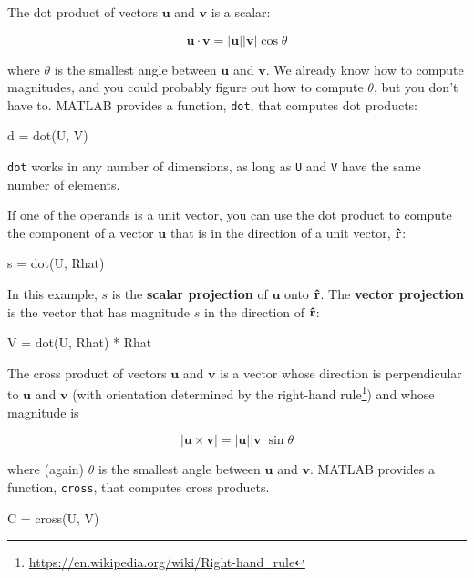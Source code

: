 \documentclass[
]{book}
\numberwithin{Answer}{chapter}
\numberwithin{Exercise}{chapter}
\renewcommand{\vec}[1]{\bm{\mathbf{#1}}}
\newcommand{\uveci}{{\bm{\hat{\textnormal{\bfseries\i}}}}}
\newcommand{\uvecj}{{\bm{\hat{\textnormal{\bfseries\j}}}}}
\newcommand{\uvec}[1]{%
    \ifthenelse{\equal{#1}{i}}%
        {\uveci}{%
    \ifthenelse{\equal{#1}{j}}%
        {\uvecj}{%
    {\bm{\hat{\mathbf{#1}}}}%
}}}
\newcommand{\norm}[1]{\lvert #1 \rvert}
\begin{document}
The dot product of vectors $\vec{u}$ and $\vec{v}$ is a scalar:

\begin{equation}
    \vec{u} \cdot \vec{v} = \norm{\vec{u}} \norm{\vec{v}} \cos \theta
\end{equation}

where $\theta$ is the smallest angle between $\vec{u}$ and
$\vec{v}$. We already know how to compute magnitudes, and you could
probably figure out how to compute $\theta$, but you don't have to.
MATLAB provides a function, {\tt dot}, that computes dot products:

\begin{code}
d = dot(U, V)
\end{code}

{\tt dot} works in any number of dimensions, as long as {\tt U}
and {\tt V} have the same number of elements.

If one of the operands is a unit vector, you can use the dot
product to compute the component of a vector $\vec{u}$ that is in
the direction of a unit vector, $\uvec{r}$:

\begin{code}
s = dot(U, Rhat)
\end{code}

In this example, $s$ is the {\bf scalar projection} of $\vec{u}$
onto $\uvec{r}$.  The {\bf vector projection} is the vector
that has magnitude $s$ in the direction of $\uvec{r}$:

\begin{code}
V = dot(U, Rhat) * Rhat
\end{code}

The cross product of vectors $\vec{u}$ and $\vec{v}$ is a vector whose
direction is perpendicular to $\vec{u}$ and $\vec{v}$
(with orientation determined by the right-hand
rule\footnote{\url{https://en.wikipedia.org/wiki/Right-hand_rule}})
and whose magnitude is

\begin{equation}
    \norm{\vec{u} \times \vec{v}} = \norm{\vec{u}} \norm{\vec{v}} \sin \theta
\end{equation}

where (again) $\theta$ is the smallest angle between $\vec{u}$ and
$\vec{v}$. MATLAB provides a function, {\tt cross}, that computes cross
products.

\begin{code}
C = cross(U, V)
\end{code}
\end{document}
